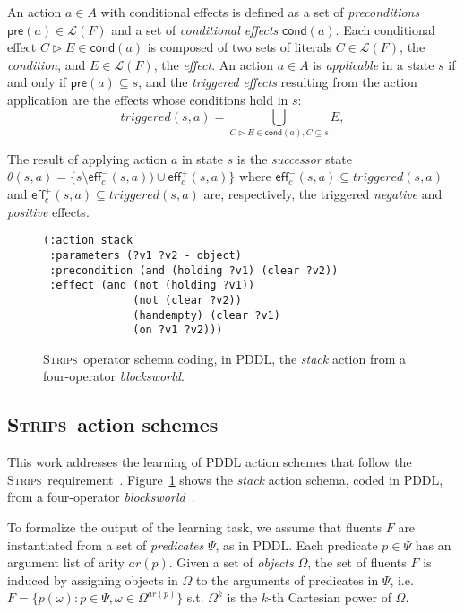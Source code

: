 \documentclass{article}
\newcommand{\pre}{\mathsf{pre}}     %
\newcommand{\eff}{\mathsf{eff}}     %
\newcommand{\cond}{\mathsf{cond}}   %
\newcommand{\strips}{\textsc{Strips}}     %
\begin{document}
An action $a\in A$ with conditional effects is defined as a set of {\em preconditions} $\pre(a)\in\mathcal{L}(F)$ and a set of {\em conditional effects} $\cond(a)$. Each conditional effect $C\rhd E\in\cond(a)$ is composed of two sets of literals $C\in\mathcal{L}(F)$, the {\em condition}, and $E\in\mathcal{L}(F)$, the {\em effect}. An action $a\in A$ is {\em applicable} in a state $s$ if and only if $\pre(a)\subseteq s$, and the {\em triggered effects} resulting from the action application are the effects whose conditions hold in $s$:
\[
triggered(s,a)=\bigcup_{C\rhd E\in\cond(a),C\subseteq s} E,
\]

The result of applying action $a$ in state $s$ is the {\em successor} state $\theta(s,a)=\{s\setminus\eff_c^-(s,a))\cup\eff_c^+(s,a)\}$ where $\eff_c^-(s,a)\subseteq triggered(s,a)$ and $\eff_c^+(s,a)\subseteq triggered(s,a)$ are, respectively, the triggered {\em negative} and {\em positive} effects.


\begin{figure}
\begin{footnotesize}
\begin{verbatim}
(:action stack
 :parameters (?v1 ?v2 - object)
 :precondition (and (holding ?v1) (clear ?v2))
 :effect (and (not (holding ?v1))
              (not (clear ?v2))
              (handempty) (clear ?v1)
              (on ?v1 ?v2)))
\end{verbatim}
\end{footnotesize}
 \caption{\small \strips\ operator schema coding, in PDDL, the {\em stack} action from a four-operator {\em blocksworld}.}
\label{fig:stack}
\end{figure}

\subsection{\strips\ action schemes}
This work addresses the learning of PDDL action schemes that follow the \strips\ requirement~\cite{mcdermott1998pddl,fox2003pddl2}. Figure~\ref{fig:stack} shows the {\em stack} action schema, coded in PDDL, from a four-operator {\em blocksworld}~\cite{slaney2001blocks}.

To formalize the output of the learning task, we assume that fluents $F$ are instantiated from a set of {\em predicates} $\Psi$, as in PDDL. Each predicate $p\in\Psi$ has an argument list of arity $ar(p)$. Given a set of {\em objects} $\Omega$, the set of fluents $F$ is induced by assigning objects in $\Omega$ to the arguments of predicates in $\Psi$, i.e.~$F=\{p(\omega):p\in\Psi,\omega\in\Omega^{ar(p)}\}$ s.t. $\Omega^k$ is the $k$-th Cartesian power of $\Omega$.
\end{document}
